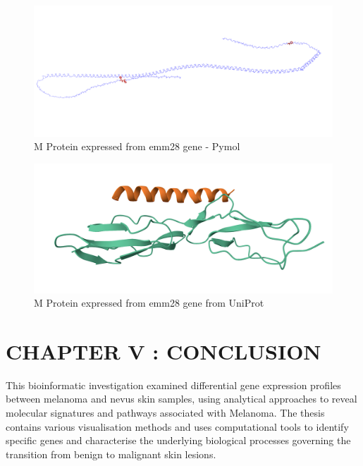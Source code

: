 \documentclass[
]{article}
\begin{document}
\begin{figure}

{\centering \includegraphics[width=1\linewidth]{Images/mprotein2} 

}

\caption{M Protein expressed from emm28 gene - Pymol}\label{fig:unnamed-chunk-46}
\end{figure}

\begin{figure}

{\centering \includegraphics[width=1\linewidth]{Images/Uniprot_M_Protein} 

}

\caption{M Protein expressed from emm28 gene from UniProt}\label{fig:unnamed-chunk-47}
\end{figure}

\newpage

\section{CHAPTER V : CONCLUSION}\label{chapter-v-conclusion}

This bioinformatic investigation examined differential gene expression
profiles between melanoma and nevus skin samples, using analytical
approaches to reveal molecular signatures and pathways associated with
Melanoma. The thesis contains various visualisation methods and uses
computational tools to identify specific genes and characterise the
underlying biological processes governing the transition from benign to
malignant skin lesions.
\end{document}
